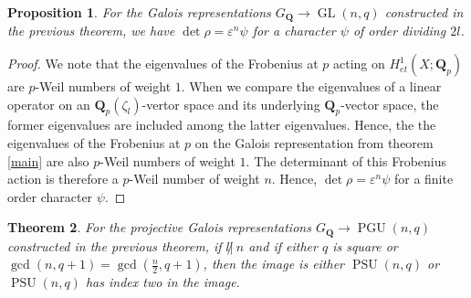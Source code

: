 \documentclass{article}
\newtheorem{theorem}{Theorem}
\newtheorem{proposition}[theorem]{Proposition}
\theoremstyle{definition}
\DeclareMathOperator{\GL}{\mathrm{GL}}
\DeclareMathOperator{\PGU}{\mathrm{PGU}}
\DeclareMathOperator{\PSU}{\mathrm{PSU}}
\begin{document}
 	\begin{proposition}
 			For the Galois representations $G_{\mathbf{Q}} \to \GL(n,q)$ constructed in the previous theorem, we have $\det \rho = \varepsilon^{n} \psi$ for a character $\psi$ of order dividing $2l$.
 	\end{proposition}
 	\begin{proof}
 		We note that the eigenvalues of the Frobenius at $p$ acting on $H^1_{et}(X; \mathbf{Q}_p)$ are $p$-Weil numbers of weight $1$. When we compare the eigenvalues of a linear operator on an $\mathbf{Q}_p(\zeta_l)$-vertor space and its underlying $\mathbf{Q}_p$-vector space, the former eigenvalues are included among the latter eigenvalues. Hence, the the eigenvalues of the Frobenius at $p$ on the Galois representation from theorem \ref{main} are also $p$-Weil numbers of weight $1$. The determinant of this Frobenius action is therefore a $p$-Weil number of weight $n$. Hence, $\det \rho = \varepsilon^{n} \psi$ for a finite order character $\psi$.
 	\end{proof}
 	\begin{theorem} \label{unitary}
 		For the projective Galois representations $G_{\mathbf{Q}} \to \PGU(n,q)$ constructed in the previous theorem, if  $l {\not |}\ n$ and if either $q$ is square or $\gcd(n,q+1)=\gcd(\frac{n}{2},q+1)$, then the image is either $\PSU(n,q)$ or $\PSU(n,q)$ has index two in the image.
 	\end{theorem}
\end{document}
